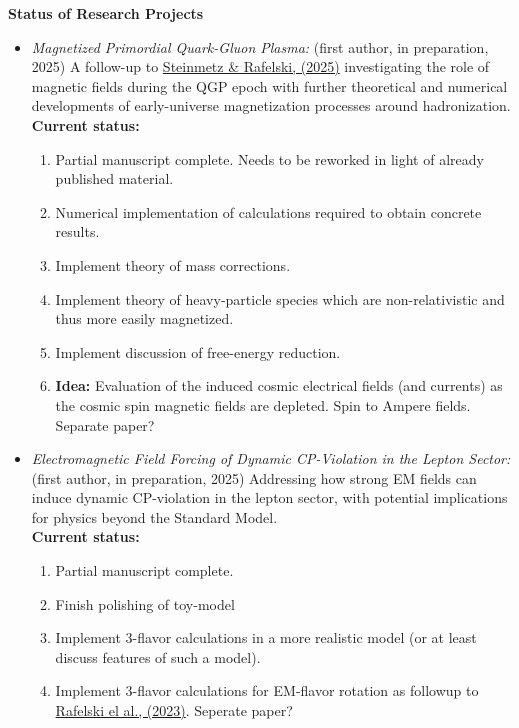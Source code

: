 \documentclass[11pt]{article}
\begin{document}
\begin{center}
    {\large\textbf{Status of Research Projects}}
\end{center}

\begin{itemize}[leftmargin=1.5em,nosep]
    \item \emph{Magnetized Primordial Quark-Gluon Plasma:} (first author, in preparation, 2025) A follow-up to \href{https://doi.org/10.48550/arXiv.2502.05052}{Steinmetz \& Rafelski, (2025)} investigating the role of magnetic fields during the QGP epoch with further theoretical and numerical developments of early-universe magnetization processes around hadronization. \\
    \textbf{Current status:} 
    \begin{enumerate}
        \item Partial manuscript complete. Needs to be reworked in light of already published material.
        \item Numerical implementation of calculations required to obtain concrete results.
        \item Implement theory of mass corrections.
        \item Implement theory of heavy-particle species which are non-relativistic and thus more easily magnetized. 
        \item Implement discussion of free-energy reduction.
        \item \textbf{Idea:} Evaluation of the induced cosmic electrical fields (and currents) as the cosmic spin magnetic fields are depleted. Spin to Ampere fields. Separate paper?
    \end{enumerate} 
    \item \emph{Electromagnetic Field Forcing of Dynamic CP-Violation in the Lepton Sector:} (first author, in preparation, 2025) Addressing how strong EM fields can induce dynamic CP-violation in the lepton sector, with potential implications for physics beyond the Standard Model.\\ 
    \textbf{Current status:}
    \begin{enumerate}
        \item Partial manuscript complete.
        \item Finish polishing of toy-model
        \item Implement 3-flavor calculations in a more realistic model (or at least discuss features of such a model).
        \item Implement 3-flavor calculations for EM-flavor rotation as followup to \href{https://doi.org/10.1142/S0217751X23501634}{Rafelski el al., (2023)}. Seperate paper?
    \end{enumerate}
\end{itemize}
\end{document}
